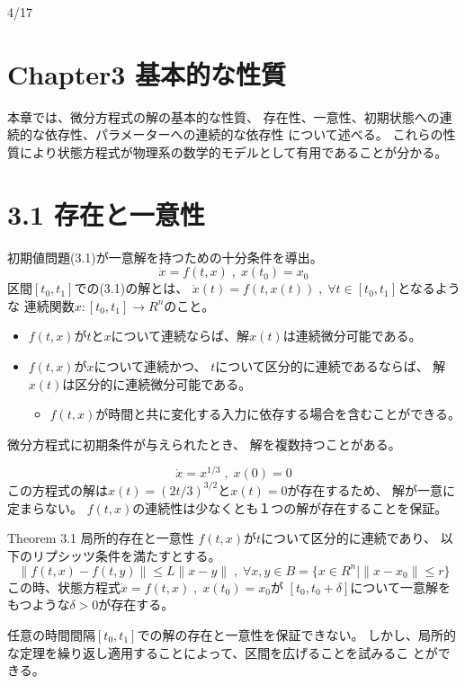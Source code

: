 \documentclass{jsarticle}
\begin{document}
4/17

\section*{Chapter3 基本的な性質}
本章では、微分方程式の解の基本的な性質、
存在性、一意性、初期状態への連続的な依存性、パラメーターへの連続的な依存性
について述べる。
これらの性質により状態方程式が物理系の数学的モデルとして有用であることが分かる。

\section*{3.1 存在と一意性}
初期値問題(3.1)が一意解を持つための十分条件を導出。
\begin{equation}
  \dot x = f(t,x)\;,\;x(t_0) = x_0 \tag{3.1}
\end{equation}
区間$[t_0,t_1]$での(3.1)の解とは、
$\dot x(t) = f(t,x(t))\;,\;\forall t\in [t_0,t_1]$となるような
連続関数$x:[t_0,t_1]\rightarrow R^n$のこと。
\begin{itemize}
  \item $f(t,x)$が$t$と$x$について連続ならば、解$x(t)$は連続微分可能である。
  \item $f(t,x)$が$x$について連続かつ、
$t$について区分的に連続であるならば、
解$x(t)$は区分的に連続微分可能である。
  \begin{itemize}
    \item $f(t,x)$が時間と共に変化する入力に依存する場合を含むことができる。
  \end{itemize}
\end{itemize}

微分方程式に初期条件が与えられたとき、
解を複数持つことがある。

\begin{equation}
  \dot x = x^{1/3}\;,\;x(0)=0 \tag{3.3}
\end{equation}
この方程式の解は$x(t)=(2t/3)^{3/2}$と$x(t)=0$が存在するため、
解が一意に定まらない。
$f(t,x)$の連続性は少なくとも１つの解が存在することを保証。

\begin{itembox}[l]{Theorem 3.1 局所的存在と一意性}
  $f(t,x)$が$t$について区分的に連続であり、
  以下のリプシッツ条件を満たすとする。
  \begin{equation*}
    \|f(t,x)-f(t,y)\| \leq L\|x-y\| \;,\; 
    \forall x,y \in B = \{x\in R^n \mid \|x-x_0\| \leq r\}
  \end{equation*}
  この時、状態方程式$\dot x = f(t,x)\;,\;x(t_0)=x_0$が
  $[t_0,t_0+\delta]$について一意解をもつような$\delta>0$が存在する。
\end{itembox}   
任意の時間間隔$[t_0,t_1]$での解の存在と一意性を保証できない。
しかし、局所的な定理を繰り返し適用することによって、区間を広げることを試みるこ
とができる。
\end{document}
